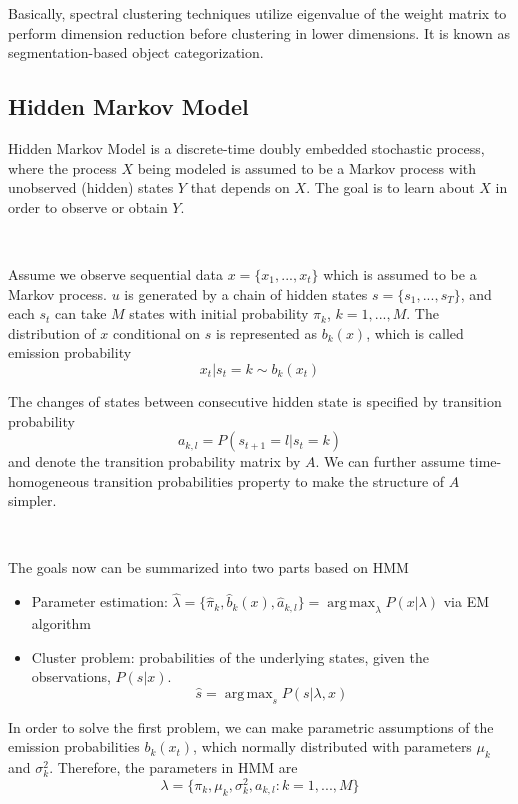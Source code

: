 \documentclass[a4paper]{article}
\DeclareMathOperator*{\argmax}{arg\,max}
\begin{document}
Basically, spectral clustering techniques utilize eigenvalue of the weight matrix to perform dimension reduction before clustering in lower dimensions. It is known as segmentation-based object categorization.


\subsection{Hidden Markov Model}

Hidden Markov Model is a discrete-time doubly embedded stochastic process, where the process $X$ being modeled is assumed to be a Markov process with unobserved (hidden) states $Y$ that depends on $X$.  The goal is to learn about $X$ in order to observe or obtain $Y$.

\

Assume we observe sequential data $x = \{ x_1, ..., x_t \}$ which is assumed to be a Markov process. $u$ is generated by a chain of hidden states $s = \{ s_1, ..., s_T\}$, and each $s_t$ can take $M$ states with initial probability $\pi_k$, $k=1, ..., M$. The distribution of $x$ conditional on $s$ is represented as $b_k(x)$, which is called emission probability
\begin{equation}
	x_t | s_t = k \sim b_k (x_t)
\end{equation}


The changes of states between consecutive hidden state is specified by transition probability 
\begin{equation}
	a_{k,l} = P(s_{t+1} = l | s_t = k) 
\end{equation}
and denote the transition probability matrix by $A$. We can further assume time-homogeneous transition probabilities property to make the structure of $A$ simpler.  

\

The goals now can be summarized into two parts based on HMM
\begin{itemize}
	\item Parameter estimation: $\hat{\lambda} = \{ \hat{\pi}_k, \hat{b}_k(x), \hat{a}_{k,l} \}  = \argmax_{\lambda} P(x | \lambda)$ via EM algorithm 
	\item Cluster problem: probabilities of the underlying states, given the observations, $P(s|x)$.
	\begin{equation}
		\hat{s} = \argmax_s P(s | \lambda, x)
	\end{equation}
\end{itemize}

In order to solve the first problem, we can make parametric assumptions of the emission probabilities $b_k(x_t)$, which normally distributed with parameters $\mu_k$ and $\sigma_k^2$. Therefore, the parameters in HMM are 
\begin{equation}
	\lambda = \{ \pi_k, \mu_k, \sigma_k^2, a_{k,l} : k = 1, ..., M \}
\end{equation}
\end{document}
